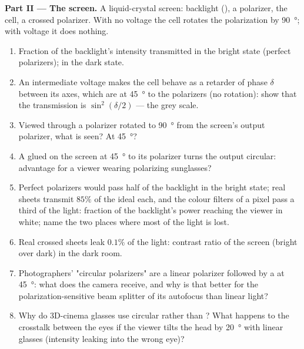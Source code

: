 \begin{problem}
\medskip
\noindent\textbf{Part II --- The screen.}
A liquid-crystal screen: backlight (), a polarizer, the
cell, a crossed polarizer. With no voltage the cell rotates the
polarization by \qty{90}{\degree}; with voltage it does nothing.
\begin{enumerate}[resume]
  \item Fraction of the backlight's intensity transmitted in the
        bright state (perfect polarizers); in the dark state.
  \item An intermediate voltage makes the cell behave as a retarder
        of phase $\delta$ between its axes, which are at \qty{45}{\degree} to the
        polarizers (no rotation): show that the transmission is
        $\sin^2(\delta/2)$ --- the grey scale.
  \item Viewed through a polarizer rotated to \qty{90}{\degree} from the
        screen's output polarizer, what is seen? At \qty{45}{\degree}?
  \item A  glued on the screen at \qty{45}{\degree} to its
        polarizer turns the output circular: advantage for a viewer
        wearing polarizing sunglasses?
  \item Perfect polarizers would pass half of the backlight in the
        bright state; real sheets transmit $85\%$ of the ideal each, and
        the colour filters of a pixel pass a third of the light:
        fraction of the backlight's power reaching the viewer in white;
        name the two places where most of the light is lost.
  \item Real crossed sheets leak $0.1\%$ of the light: contrast ratio
        of the screen (bright over dark) in the dark room.
  \item Photographers' "circular polarizers" are a linear polarizer
        followed by a  at \qty{45}{\degree}: what does
        the camera receive, and why is that better for the
        polarization-sensitive beam splitter of its autofocus than
        linear light?
  \item Why do 3D-cinema glasses use circular rather than ? What happens to the crosstalk between the eyes
        if the viewer tilts the head by \qty{20}{\degree} with linear
        glasses (intensity leaking into the wrong eye)?
\end{enumerate}


\end{problem}
